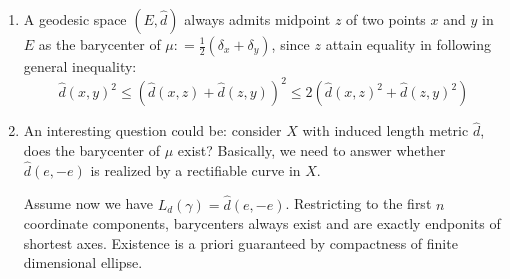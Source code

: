 \begin{rmk}
\begin{enumerate}
		\item A geodesic space $(E, \hat{d})$ always admits midpoint $z$ of two points $x$ and $y$ in $E$ as the barycenter of $\mu : = \frac{1}{2} (\delta_x + \delta_y)$, since $z$ attain equality in following general inequality:
		      \[
			      \hat{d}(x,y)^2 \leq \left(\hat{d}(x,z) + \hat{d}(z,y)\right)^2 \leq 2\left(\hat{d}(x,z)^2+ \hat{d}(z,y)^2\right)
		      \]
		\item An interesting question could be: consider $X$ with induced length metric $\hat{d}$, does the barycenter of $\mu$ exist?
		      Basically, we need to answer whether $\hat{d}(e,-e)$ is realized by a rectifiable curve in $X$.

		      Assume now we have $L_{d}(\gamma)=\hat{d}(e,-e)$.
		      Restricting to the first $n$ coordinate components, barycenters always exist and are exactly endponits of shortest axes. Existence is a priori guaranteed by compactness of finite dimensional ellipse.


\end{enumerate}
\end{rmk}
